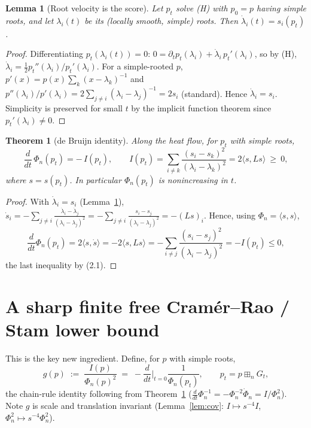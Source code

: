 \documentclass[12pt]{article}
\newtheorem{theorem}{Theorem}
\newtheorem{lemma}{Lemma}
\theoremstyle{remark}
\newcommand{\boxp}{\boxplus_n}
\newcommand{\inner}[2]{\langle #1,#2\rangle}
\begin{document}
\begin{lemma}[Root velocity is the score]\label{lem:rootvel}
Let $p_t$ solve (H) with $p_0=p$ having simple roots, and let
$\lambda_i(t)$ be its (locally smooth, simple) roots.  Then
$\dot\lambda_i(t)=s_i(p_t)$.
\end{lemma}

\begin{proof}
Differentiating $p_t(\lambda_i(t))=0$:
$0=\partial_tp_t(\lambda_i)+\dot\lambda_i\,p_t'(\lambda_i)$, so by (H),
$\dot\lambda_i=\tfrac12 p_t''(\lambda_i)/p_t'(\lambda_i)$.  For a simple-rooted
$p$, $p'(x)=p(x)\sum_k(x-\lambda_k)^{-1}$ and
$p''(\lambda_i)/p'(\lambda_i)=2\sum_{j\neq i}(\lambda_i-\lambda_j)^{-1}=2s_i$
(standard).  Hence $\dot\lambda_i=s_i$.  Simplicity is preserved for small $t$
by the implicit function theorem since $p_t'(\lambda_i)\ne0$.
\end{proof}

\begin{theorem}[de Bruijn identity]\label{thm:debruijn}
Along the heat flow, for $p_t$ with simple roots,
\[
\frac{d}{dt}\,\Phi_n(p_t)=-\,I(p_t),\qquad
I(p_t)=\sum_{i\neq k}\frac{(s_i-s_k)^2}{(\lambda_i-\lambda_k)^2}=2\inner{s}{Ls}\ \ge\ 0 ,
\]
where $s=s(p_t)$.  In particular $\Phi_n(p_t)$ is nonincreasing in $t$.
\end{theorem}

\begin{proof}
With $\dot\lambda_i=s_i$ (Lemma~\ref{lem:rootvel}),
$\dot s_i=-\sum_{j\neq i}\frac{\dot\lambda_i-\dot\lambda_j}{(\lambda_i-\lambda_j)^2}
=-\sum_{j\neq i}\frac{s_i-s_j}{(\lambda_i-\lambda_j)^2}=-(Ls)_i$.
Hence, using $\Phi_n=\inner{s}{s}$,
\[
\frac{d}{dt}\Phi_n(p_t)=2\inner{s}{\dot s}=-2\inner{s}{Ls}
=-\sum_{i\neq j}\frac{(s_i-s_j)^2}{(\lambda_i-\lambda_j)^2}=-I(p_t)\le0,
\]
the last inequality by (2.1).
\end{proof}

\section{A sharp finite free Cram\'er--Rao / Stam lower bound}\label{sec:cr}

This is the key new ingredient.  Define, for $p$ with simple roots,
\[
g(p)\;:=\;\frac{I(p)}{\Phi_n(p)^2}\;=\;-\frac{d}{dt}\Big|_{t=0}\frac{1}{\Phi_n(p_t)},
\qquad p_t=p\boxp G_t,
\]
the chain-rule identity following from Theorem~\ref{thm:debruijn}
($\frac{d}{dt}\Phi_n^{-1}=-\Phi_n^{-2}\dot\Phi_n=I/\Phi_n^2$).  Note $g$ is
scale and translation invariant (Lemma~\ref{lem:cov}: $I\mapsto s^{-4}I$,
$\Phi_n^2\mapsto s^{-4}\Phi_n^2$).
\end{document}
